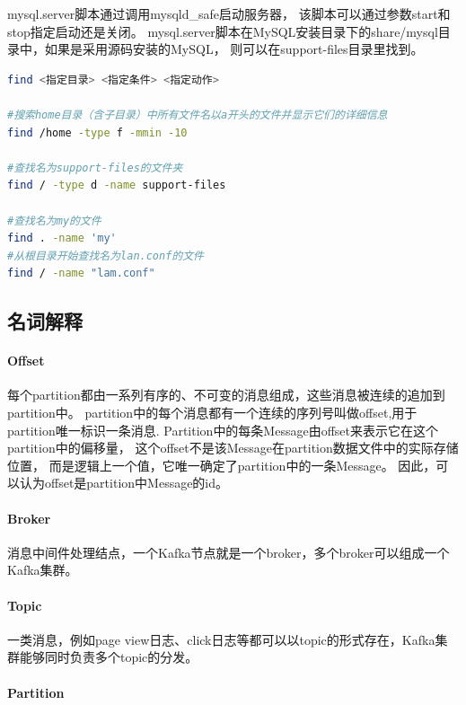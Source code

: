 \documentclass{book}
\begin{document}
mysql.server脚本通过调用mysqld\_safe启动服务器，
该脚本可以通过参数start和stop指定启动还是关闭。
mysql.server脚本在MySQL安装目录下的share/mysql目录中，如果是采用源码安装的MySQL，
则可以在support-files目录里找到。

\begin{lstlisting}[language=Bash]
find <指定目录> <指定条件> <指定动作>

#搜索home目录（含子目录）中所有文件名以a开头的文件并显示它们的详细信息
find /home -type f -mmin -10

#查找名为support-files的文件夹
find / -type d -name support-files

#查找名为my的文件
find . -name 'my'
#从根目录开始查找名为lan.conf的文件
find / -name "lam.conf"
\end{lstlisting}

\subsection{名词解释}

\paragraph{Offset}

每个partition都由一系列有序的、不可变的消息组成，这些消息被连续的追加到partition中。
partition中的每个消息都有一个连续的序列号叫做offset,用于partition唯一标识一条消息.
Partition中的每条Message由offset来表示它在这个partition中的偏移量，
这个offset不是该Message在partition数据文件中的实际存储位置，
而是逻辑上一个值，它唯一确定了partition中的一条Message。
因此，可以认为offset是partition中Message的id。

\paragraph{Broker}

消息中间件处理结点，一个Kafka节点就是一个broker，多个broker可以组成一个Kafka集群。

\paragraph{Topic}

一类消息，例如page view日志、click日志等都可以以topic的形式存在，Kafka集群能够同时负责多个topic的分发。

\paragraph{Partition}
\end{document}

